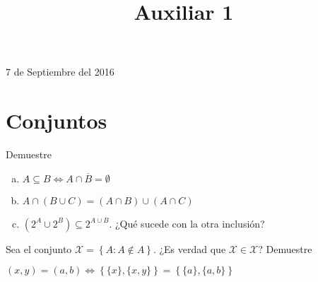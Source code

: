 \documentclass[dcc]{fcfmcourse}
\title{Auxiliar 1}
\begin{document}
\maketitle
\begin{center}
7 de Septiembre del 2016
\end{center}
\vspace{-1ex}

\section*{Conjuntos}
\begin{problems}
\problem Demuestre
\begin{enumerate}[a)]
\item $A \subseteq B \Leftrightarrow A \cap \overline{B} = \emptyset$
\item $A \cap (B \cup C) = (A \cap B) \cup (A \cap C)$
\item $(2^A \cup 2^B) \subseteq 2^{A \cup B}$. ¿Qué sucede con la otra inclusión?
\end{enumerate}
\problem Sea el conjunto $\mathcal{X} = \left\{ A : A \not \in A \right\}$. ¿Es verdad que $\mathcal{X} \in \mathcal{X}$?
\problem Demuestre 
\begin{center}
$(x,y) = (a,b) \Leftrightarrow \left\{ \{x\} , \{x,y\}\right\} = \left\{ \{a\} , \{a,b\}\right\}$
\end{center}

\end{problems}
\end{document}
